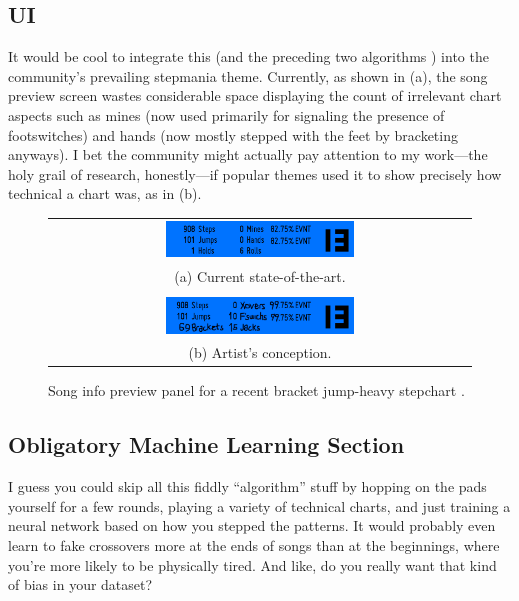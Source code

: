 \documentclass[10pt]{sigplanconf}
\begin{document}
\subsection{UI}

It would be cool to integrate this (and the preceding two algorithms \cite{turniness,crossoveriness})
into
the community's prevailing stepmania theme.
Currently, as shown in (a),
the song preview screen wastes considerable space displaying the count of irrelevant chart aspects
such as mines (now used primarily for signaling the presence of footswitches)
and hands (now mostly stepped with the feet by bracketing anyways).
I bet the community might actually pay attention to my work---the holy grail of research, honestly---if
popular themes used it to show precisely how technical a chart was, as in (b).

\begin{figure}[t]
	\begin{tabular}{c}
	\includegraphics[width=0.46\textwidth]{song-info.png} \\
		(a) Current state-of-the-art.
		\\
		\\
	\includegraphics[width=0.46\textwidth]{song-info-better.png} \\
		(b) Artist's conception.
	\end{tabular}
	\caption{Song info preview panel for a recent bracket jump-heavy stepchart \cite{divine}.}
	\label{fig:songpreview}
\end{figure}

\subsection{Obligatory Machine Learning Section}

I guess you could skip all this fiddly ``algorithm'' stuff by
hopping on the pads yourself for a few rounds, playing a variety of technical charts,
and just training a neural network based on how you stepped the patterns.
It would probably even learn to fake crossovers more at the ends of songs than at the beginnings,
where you're more likely to be physically tired.
And like, do you really want that kind of bias in your dataset?
\end{document}
